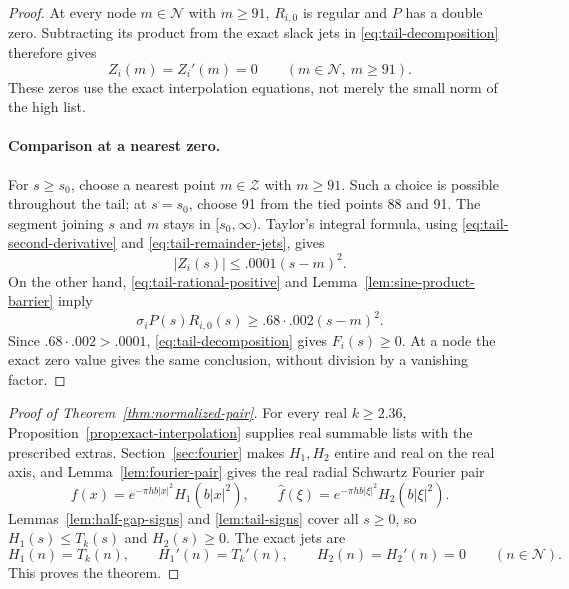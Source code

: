 \begin{proof}
At every node \(m\in\mathcal N\) with \(m\ge91\), \(R_{i,0}\) is regular and
\(P\) has a double zero.  Subtracting its product from the exact slack jets
in \eqref{eq:tail-decomposition} therefore gives
\begin{equation}\label{eq:tail-remainder-jets}
 Z_i(m)=Z_i'(m)=0\qquad(m\in\mathcal N,\ m\ge91).
\end{equation}
These zeros use the exact interpolation equations, not merely the small norm
of the high list.

\paragraph{Comparison at a nearest zero.}
For \(s\ge s_0\), choose a nearest point \(m\in\mathcal Z\) with \(m\ge91\).
Such a choice is possible throughout the tail; at \(s=s_0\), choose 91 from
the tied points 88 and 91.  The segment joining \(s\) and \(m\) stays in
\([s_0,\infty)\).  Taylor's integral formula, using
\eqref{eq:tail-second-derivative} and \eqref{eq:tail-remainder-jets}, gives
\[
 |Z_i(s)|\le .0001(s-m)^2.
\]
On the other hand, \eqref{eq:tail-rational-positive} and
Lemma~\ref{lem:sine-product-barrier} imply
\[
 \sigma_iP(s)R_{i,0}(s)\ge .68\cdot.002(s-m)^2.
\]
Since \(.68\cdot.002>.0001\), \eqref{eq:tail-decomposition} gives
\(F_i(s)\ge0\).  At a node the exact zero value gives the same conclusion,
without division by a vanishing factor.
\end{proof}

\begin{proof}[Proof of Theorem~\ref{thm:normalized-pair}]
For every real \(k\ge2.36\), Proposition~\ref{prop:exact-interpolation}
supplies real summable lists with the prescribed extras.  Section~\ref{sec:fourier}
makes \(H_1,H_2\) entire and real on the real axis, and
Lemma~\ref{lem:fourier-pair} gives the real radial Schwartz Fourier pair
\[
 f(x)=e^{-\pi hb|x|^2}H_1(b|x|^2),\qquad
 \widehat f(\xi)=e^{-\pi hb|\xi|^2}H_2(b|\xi|^2).
\]
Lemmas~\ref{lem:half-gap-signs} and \ref{lem:tail-signs} cover all \(s\ge0\),
so \(H_1(s)\le T_k(s)\) and \(H_2(s)\ge0\).  The exact jets are
\[
 H_1(n)=T_k(n),\qquad H_1'(n)=T_k'(n),\qquad
 H_2(n)=H_2'(n)=0\qquad(n\in\mathcal N).
\]
This proves the theorem.
\end{proof}
